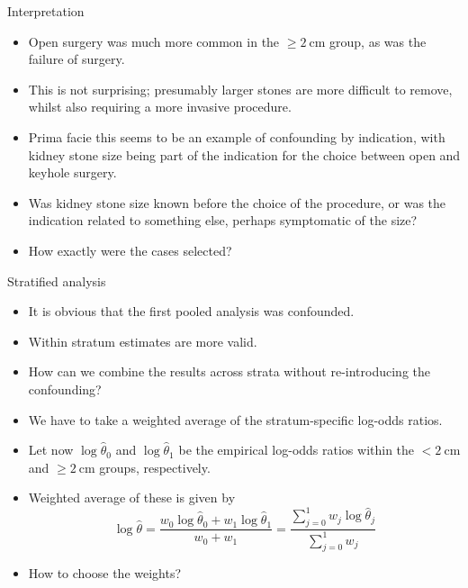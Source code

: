 \documentclass[10pt]{beamer}\usepackage[]{graphicx}\usepackage[]{color}
\begin{document}
\begin{frame}{Interpretation}
\begin{itemize}
	\item Open surgery was much more common in the $\geq 2 \mathrm{~cm}$ group, as was the failure of surgery.
	\item  This is not surprising; presumably larger stones are more difficult to remove, whilst also requiring a more invasive procedure.
	\item  Prima facie this seems to be an example of confounding by indication, with kidney stone size being part of the indication for the choice between open and keyhole
	surgery.
	\item  Was kidney stone size known before the choice of the procedure, or was the indication related to something else, perhaps symptomatic of the size?
	\item  How exactly were the cases selected?
\end{itemize}
\end{frame}




\begin{frame}{Stratified analysis}
	\begin{itemize}
		\item It is obvious that the first pooled analysis was confounded.
		\item  Within stratum estimates are more valid.
		\item  How can we combine the results across strata without
		re-introducing the confounding?
		\item  We have to take a weighted average of the stratum-specific log-odds ratios.
		\item  Let now $\log \hat{\theta}_{0}$ and $\log \hat{\theta}_{1}$ be the empirical log-odds ratios within the $<2 \mathrm{~cm}$ and $\geq 2 \mathrm{~cm}$ groups, respectively.
		\item  Weighted average of these is given by
		$$
		\log \hat{\theta}=\frac{w_{0} \log \hat{\theta}_{0}+w_{1} \log \hat{\theta}_{1}}{w_{0}+w_{1}}=\frac{\sum_{j=0}^{1} w_{j} \log \hat{\theta}_{j}}{\sum_{j=0}^{1} w_{j}}
		$$
		\item  How to choose the weights?
	\end{itemize}
\end{frame}
\end{document}
